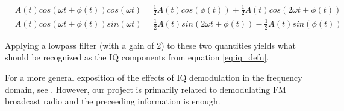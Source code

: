 \documentclass[a4paper, 12pt]{article}
\begin{document}
\begin{equation*}
\label{eq:quadrature_sampling4}
\begin{aligned}
  &A(t)cos(\omega t + \phi(t))cos(\omega t) = \frac{1}{2}A(t)cos(\phi(t)) + \frac{1}{2}A(t)cos(2\omega t + \phi (t))\\
  &A(t)cos(\omega t + \phi(t))sin(\omega t) = \frac{1}{2}A(t)sin(2\omega t + \phi(t)) - \frac{1}{2}A(t)sin(\phi(t))
\end{aligned}
\end{equation*}

Applying a lowpass filter (with a gain of 2) to these two quantities yields what should be recognized as the IQ components from equation \ref{eq:iq_defn}.

For a more general exposition of the effects of IQ demodulation in the frequency domain, see \cite{iq_sampling}.  However, our project is primarily related to demodulating FM broadcast radio and the preceeding information is enough.

\clearpage


\end{document}
